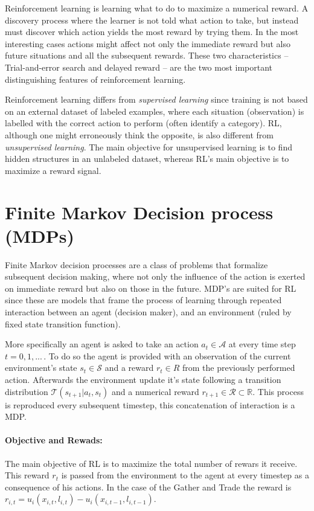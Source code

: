 Reinforcement learning is learning what to do to maximize a numerical reward. A discovery process where the learner is not told what action to take, but instead must discover which action yields the most reward by trying them. In the most interesting cases actions might affect not only the immediate reward but also future situations and all the subsequent rewards. These two characteristics -- Trial-and-error search and delayed reward -- are the two most important distinguishing features of reinforcement learning.

Reinforcement learning differs from \textit{supervised learning} since training is not based on an external dataset of labeled examples, where each situation (observation) is labelled with the correct action to perform (often identify a category). RL, although one might erroneously think the opposite, is also different from \textit{unsupervised learning}. The main objective for unsupervised learning is to find hidden structures in an unlabeled dataset, whereas RL's main objective is to maximize a reward signal. 

\section{Finite Markov Decision process (MDPs)}

Finite Markov decision processes are a class of problems that formalize subsequent decision making, where not only the influence of the action is exerted on immediate reward but also on those in the future. MDP's are suited for RL since these are models that frame the process of learning through repeated interaction between an agent (decision maker), and an environment (ruled by fixed state transition function).

More specifically an agent is asked to take an action \( a_t \in \mathcal{A} \) at every time step \( t = 0,1,...\, \). To do so the agent is provided with an observation of the current environment's state \( s_t \in \mathcal{S} \) and a reward \( r_t \in R \) from the previously performed action. Afterwards the environment update it's state following a transition distribution \( \mathcal{T}(s_{t+1}|a_t,s_t) \) and a numerical reward \( r_{t+1} \in \mathcal{R} \subset \mathbb{R} \). This process is reproduced every subsequent timestep, this concatenation of interaction is a MDP.

\paragraph{Objective and Rewads:} The main objective of RL is to maximize the total number of rewars it receive. This reward \( r_t \) is passed from the environment to the agent at every timestep as a consequence of his actions. In the case of the Gather and Trade the reward is \( r_{i,t} = u_i(x_{i,t},l_{i,t})  - u_i(x_{i,t-1},l_{i,t-1}) \). 

